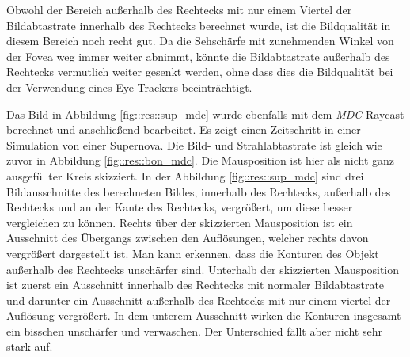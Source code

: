 Obwohl der Bereich außerhalb des Rechtecks mit nur einem Viertel der Bildabtastrate innerhalb des Rechtecks berechnet wurde, ist die Bildqualität in diesem Bereich noch recht gut.
Da die Sehschärfe mit zunehmenden Winkel von der Fovea weg immer weiter abnimmt, könnte die Bildabtastrate außerhalb des Rechtecks vermutlich weiter gesenkt werden, ohne dass dies die Bildqualität bei der Verwendung eines Eye-Trackers beeinträchtigt.

Das Bild in Abbildung \ref{fig::res::sup_mdc} wurde ebenfalls mit dem \emph{MDC} Raycast berechnet und anschließend bearbeitet.
Es zeigt einen Zeitschritt in einer Simulation von einer Supernova.
Die Bild- und Strahlabtastrate ist gleich wie zuvor in Abbildung \ref{fig::res::bon_mdc}.
Die Mausposition ist hier als nicht ganz ausgefüllter Kreis skizziert.
In der Abbildung \ref{fig::res::sup_mdc} sind drei Bildausschnitte des berechneten Bildes, innerhalb des Rechtecks, außerhalb des Rechtecks und an der Kante des Rechtecks, vergrößert, um diese besser vergleichen zu können.
Rechts über der skizzierten Mausposition ist ein Ausschnitt des Übergangs zwischen den Auflösungen, welcher rechts davon vergrößert dargestellt ist.
Man kann erkennen, dass die Konturen des Objekt außerhalb des Rechtecks unschärfer sind.
Unterhalb der skizzierten Mausposition ist zuerst ein Ausschnitt innerhalb des Rechtecks mit normaler Bildabtastrate und darunter ein Ausschnitt außerhalb des Rechtecks mit nur einem viertel der Auflösung vergrößert.
In dem unterem Ausschnitt wirken die Konturen insgesamt ein bisschen unschärfer und verwaschen.
Der Unterschied fällt aber nicht sehr stark auf.

